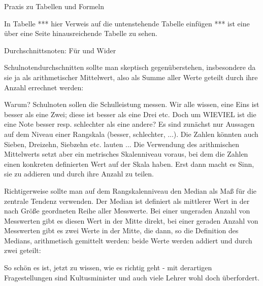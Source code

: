 Praxis zu Tabellen und Formeln

In Tabelle *** hier Verweis auf die untenstehende Tabelle einfügen *** ist eine über eine Seite hinausreichende Tabelle zu sehen. 


Durchschnittsnoten: Für und Wider

Schulnotendurchschnitten sollte man skeptisch gegenüberstehen, insbesondere da sie ja als arithmetischer Mittelwert, also als Summe aller Werte geteilt durch ihre Anzahl errechnet werden:


Warum?
Schulnoten sollen die Schulleistung messen. Wir alle wissen, eine Eins ist besser als eine  Zwei; diese ist besser als eine  Drei etc.
Doch um WIEVIEL ist die eine Note besser resp. schlechter als eine andere? Es sind zunächst nur Aussagen auf dem Niveau einer Rangskala (besser, schlechter, ...). Die Zahlen könnten auch  Sieben,  Dreizehn,  Siebzehn etc. lauten ...
Die Verwendung des arithmischen Mittelwerts setzt aber ein metrisches Skalenniveau voraus, bei dem die Zahlen einen konkreten definierten Wert auf der Skala haben. Erst dann macht es Sinn, sie zu addieren und durch ihre Anzahl zu teilen.

Richtigerweise sollte man auf dem Rangskalenniveau den Median als Maß für die  zentrale Tendenz verwenden. Der Median ist definiert als mittlerer Wert in der nach Größe geordneten Reihe aller Messwerte. Bei einer ungeraden Anzahl von Messwerten gibt es diesen Wert in der Mitte direkt, bei einer geraden Anzahl von Messwerten gibt es zwei Werte in der Mitte, die dann, so die Definition des Medians, arithmetisch gemittelt werden: beide Werte werden addiert und durch zwei geteilt: 


So schön es ist, jetzt zu wissen, wie es richtig geht - mit derartigen Fragestellungen sind Kultusminister und auch viele Lehrer wohl doch überfordert.